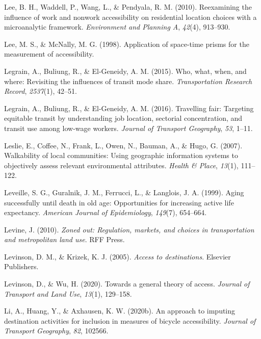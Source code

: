 \documentclass[
11pt, %
oneside, %
english, %
singlespacing, %
]{macthesis} %
\newlength{\cslhangindent}
\newenvironment{CSLReferences}[2] %
{\begin{list}{}{%
	\setlength{\itemindent}{0pt}
	\setlength{\leftmargin}{0pt}
	\setlength{\parsep}{0pt}
	\ifodd #1
	\setlength{\leftmargin}{\cslhangindent}
	\setlength{\itemindent}{-1\cslhangindent}
	\fi
	\setlength{\itemsep}{#2\baselineskip}}}
{\end{list}}
\begin{document}
\begin{CSLReferences}{1}{0}
Lee, B. H., Waddell, P., Wang, L., \& Pendyala, R. M. (2010). Reexamining the influence of work and nonwork accessibility on residential location choices with a microanalytic framework. \emph{Environment and Planning A}, \emph{42}(4), 913--930.

Lee, M. S., \& McNally, M. G. (1998). Application of space-time prisms for the measurement of accessibility.

Legrain, A., Buliung, R., \& El-Geneidy, A. M. (2015). Who, what, when, and where: Revisiting the influences of transit mode share. \emph{Transportation Research Record}, \emph{2537}(1), 42--51.

Legrain, A., Buliung, R., \& El-Geneidy, A. M. (2016). Travelling fair: Targeting equitable transit by understanding job location, sectorial concentration, and transit use among low-wage workers. \emph{Journal of Transport Geography}, \emph{53}, 1--11.

Leslie, E., Coffee, N., Frank, L., Owen, N., Bauman, A., \& Hugo, G. (2007). Walkability of local communities: Using geographic information systems to objectively assess relevant environmental attributes. \emph{Health \& Place}, \emph{13}(1), 111--122.

Leveille, S. G., Guralnik, J. M., Ferrucci, L., \& Langlois, J. A. (1999). Aging successfully until death in old age: Opportunities for increasing active life expectancy. \emph{American Journal of Epidemiology}, \emph{149}(7), 654--664.

Levine, J. (2010). \emph{Zoned out: Regulation, markets, and choices in transportation and metropolitan land use}. RFF Press.

Levinson, D. M., \& Krizek, K. J. (2005). \emph{Access to destinations}. Elsevier Publishers.

Levinson, D., \& Wu, H. (2020). Towards a general theory of access. \emph{Journal of Transport and Land Use}, \emph{13}(1), 129--158.

Li, A., Huang, Y., \& Axhausen, K. W. (2020b). An approach to imputing destination activities for inclusion in measures of bicycle accessibility. \emph{Journal of Transport Geography}, \emph{82}, 102566.


\end{CSLReferences}
\end{document}

